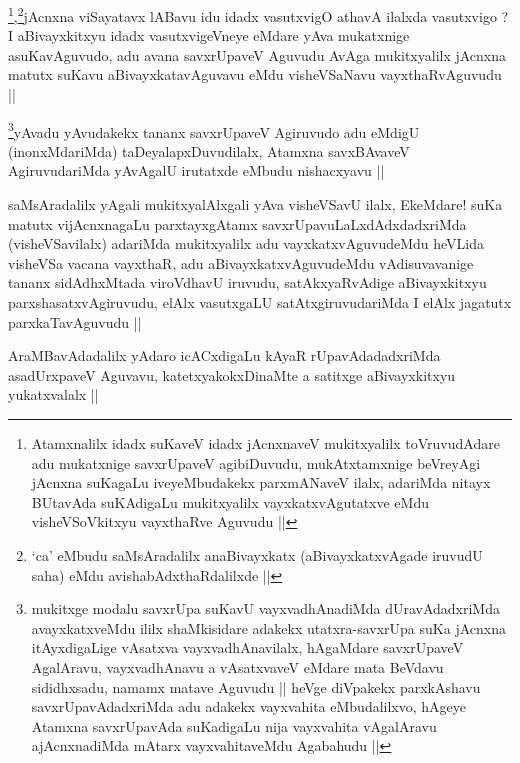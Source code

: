 
\begin{artha}
\footnote{Atamxnalilx idadx suKaveV idadx jAcnxnaveV mukitxyalilx
  toVruvudAdare adu mukatxnige savxrUpaveV agibiDuvudu, mukAtxtamxnige
beVreyAgi jAcnxna suKagaLu iveyeMbudakekx parxmANaveV ilalx, adariMda
nitayx BUtavAda suKAdigaLu mukitxyalilx vayxkatxvAgutatxve eMdu
visheVSoVkitxyu vayxthaRve Aguvudu ||},\footnote{`ca' eMbudu
  saMsAradalilx anaBivayxkatx (aBivayxkatxvAgade iruvudU saha) eMdu
  avishabAdxthaRdalilxde ||}jAcnxna viSayatavx lABavu idu idadx vasutxvigO athavA
ilalxda vasutxvigo ? I aBivayxkitxyu idadx vasutxvigeVneye eMdare yAva
mukatxnige asuKavAguvudo, adu avana savxrUpaveV Aguvudu AvAga
mukitxyalilx jAcnxna matutx suKavu aBivayxkatavAguvavu eMdu
visheVSaNavu vayxthaRvAguvudu ||
\end{artha}

\begin{artha}
\footnote{mukitxge modalu savxrUpa suKavU vayxvadhAnadiMda
  dUravAdadxriMda avayxkatxveMdu ililx shaMkisidare adakekx
  utatxra-savxrUpa suKa jAcnxna itAyxdigaLige vAsatxva
  vayxvadhAnavilalx, hAgaMdare savxrUpaveV AgalAravu, vayxvadhAnavu a
  vAsatxvaveV eMdare mata BeVdavu sididhxsadu, namamx matave Aguvudu
  || heVge diVpakekx parxkAshavu savxrUpavAdadxriMda adu adakekx
  vayxvahita eMbudalilxvo, hAgeye Atamxna savxrUpavAda suKadigaLu nija
vayxvahita vAgalAravu ajAcnxnadiMda mAtarx vayxvahitaveMdu Agabahudu ||}yAvadu yAvudakekx tananx savxrUpaveV Agiruvudo adu eMdigU
(inonxMdariMda) taDeyalapxDuvudilalx, Atamxna savxBAvaveV
AgiruvudariMda yAvAgalU irutatxde eMbudu nishacxyavu ||
\end{artha}


\begin{artha}
saMsAradalilx yAgali mukitxyalAlxgali yAva visheVSavU ilalx, EkeMdare!
suKa matutx vijAcnxnagaLu parxtayxgAtamx savxrUpavuLaLxdAdxdadxriMda
(visheVSavilalx) adariMda mukitxyalilx adu vayxkatxvAguvudeMdu heVLida
visheVSa vacana vayxthaR, adu aBivayxkatxvAguvudeMdu vAdisuvavanige
tananx sidAdhxMtada viroVdhavU iruvudu, satAkxyaRvAdige aBivayxkitxyu
parxshasatxvAgiruvudu, elAlx vasutxgaLU satAtxgiruvudariMda I elAlx
jagatutx parxkaTavAguvudu ||
\end{artha}

\begin{artha}
AraMBavAdadalilx yAdaro icACxdigaLu kAyaR rUpavAdadadxriMda
asadUrxpaveV Aguvavu, katetxyakokxDinaMte a satitxge aBivayxkitxyu
yukatxvalalx ||
\end{artha}

